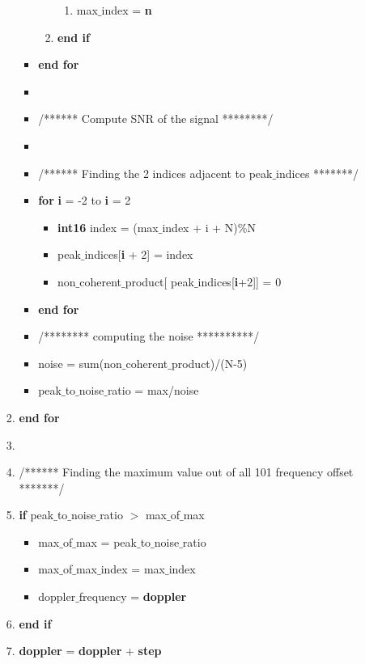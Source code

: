 \documentclass[journal,10pt,onecolumn]{article}
\begin{document}
\begin{itemize}
\begin{enumerate}
\begin{enumerate}
\begin{itemize}
\begin{enumerate}
\begin{enumerate}
                    \item[] max$\_$index = \textbf{n}
                \end{enumerate}
               \item[] \textbf{end if}
            \end{enumerate}
            \item[] \textbf{end for} 
            \item[] 
            \item[] /****** Compute SNR of the signal ********/
            \item[] 
            \item[] /****** Finding the 2 indices adjacent to peak$\_$indices *******/
            \item[] \textbf{for} \textbf{i} = -2 to \textbf{i} = 2
            \begin{itemize}
                \item[] \textbf{int16} index = (max$\_$index + i + N)\%N
                \item[] peak$\_$indices[\textbf{i} + 2] = index
                \item[] non$\_$coherent$\_$product[ peak$\_$indices[\textbf{i}+2]] = 0
            \end{itemize}
            \item[] \textbf{end for}
            
            \item[] /******** computing the noise **********/
            \item[] noise = sum(non$\_$coherent$\_$product)/(N-5)
            
            \item[] peak$\_$to$\_$noise$\_$ratio = max/noise
            







        \end{itemize}
        \item[] \textbf{end for}
    \item[] 
    \item[] /****** Finding the maximum value out of all 101 frequency offset *******/
    \item[] \textbf{if}  peak$\_$to$\_$noise$\_$ratio $>$ max$\_$of$\_$max
    \begin{itemize}
        \item[] max$\_$of$\_$max = peak$\_$to$\_$noise$\_$ratio
        \item[] max$\_$of$\_$max$\_$index = max$\_$index
        \item[] doppler$\_$frequency = \textbf{doppler}
    \end{itemize}
    \item[] \textbf{end if}
    \item[] \textbf{doppler} = \textbf{doppler} + \textbf{step}


\end{enumerate}
\end{enumerate}
\end{itemize}
\end{document}
